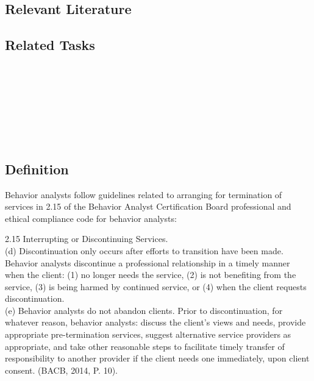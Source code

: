 \subsection{Relevant Literature}
\begin{refsection}
\nocite{test,alang2017police,clayton2018black}
\printbibliography[heading=none]
\end{refsection}
%
\subsection{Related Tasks}
\fourhOne{}\\
\fourjOne{}\\
\fourkThree{}\\
\fourkFour{}\\
\fourkSix{}\\
\fourkEight{}\\
%
%
%
%
%
%
%
%
%
%
\section[\fourkTen{}]{\fourkTen{}%
              }
\subsection{Definition}
Behavior analysts follow guidelines related to arranging for termination of services in 2.15 of the Behavior Analyst Certification Board professional and ethical compliance code for behavior analysts:

2.15 Interrupting or Discontinuing Services. \\
 (d) Discontinuation only occurs after efforts to transition have been made. Behavior analysts discontinue a professional relationship in a timely manner when the client: (1) no longer needs the service, (2) is not benefiting from the service, (3) is being harmed by continued service, or (4) when the client requests discontinuation. \\
(e) Behavior analysts do not abandon clients. Prior to discontinuation, for whatever reason, behavior analysts: discuss the client's views and needs, provide appropriate pre-termination services, suggest alternative service providers as appropriate, and take other reasonable steps to facilitate timely transfer of responsibility to another provider if the client needs one immediately, upon client consent. (BACB, 2014, P. 10).

